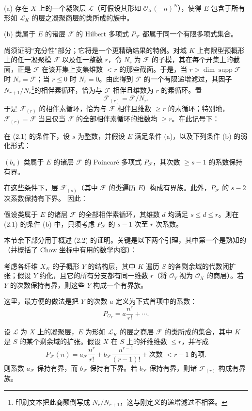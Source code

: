 \medskip
\noindent (a) 存在 $X$ 上的一个凝聚层 $\mathcal L$（可假设其形如
$\mathcal O_X(-n)^N$），使得 $E$ 包含于所有形如 $\mathcal L_K$ 的层之凝聚商层的类所成的族中。

\smallskip
\noindent (b) 类属于 $E$ 的诸层 $\mathcal F$ 的 Hilbert 多项式
$P_{\mathcal F}$ 都属于同一个有限多项式集合。

尚须证明“充分性”部分；它将是一个更精确结果的特例。对域 $K$ 上有限型预概形上的任一凝聚模 $\mathcal F$ 以及任一整数 $r$，令
$N_r$ 为 $\mathcal F$ 的子模，其在每个开集上的截面，正是
$\mathcal F$ 在该开集上支集维数 $<r$ 的那些截面。于是，当
$r>\dim\operatorname{supp}\mathcal F$ 时
$N_r=\mathcal F$；当 $r\leq0$ 时 $N_r=0$。由此得到
$\mathcal F$ 的一个有限递增滤过，其因子
$N_{r+1}/N_r$\footnote{印刷文本把此商颠倒写成
$N_r/N_{r+1}$，这与刚定义的递增滤过不相容。}的相伴素循环，恰为与
$\mathcal F$ 相伴且维数为 $r$ 的素循环。置
\[
\mathcal F_{(r)}=\mathcal F/N_r.
\]
于是 $\mathcal F_{(r)}$ 的相伴素循环，恰为与 $\mathcal F$ 相伴且维数
$\geq r$ 的素循环；特别地，$\mathcal F_{(r)}=\mathcal F$ 当且仅当
$\mathcal F$ 的全部相伴素循环的维数均 $\geq r$。在此记号下：

 在 (2.1) 的条件下，设 $s$ 为整数，并假设 $E$ 满足条件 (a)，以及下列条件 (b) 的弱化形式：

\medskip
\noindent $(b_s)$ 类属于 $E$ 的诸层 $\mathcal F$ 的 Poincaré 多项式
$P_{\mathcal F}$，其次数 $\geq s-1$ 的系数保持有界。

在这些条件下，层 $\mathcal F_{(s)}$（其中 $\mathcal F$ 的类遍历
$E$）构成有界族。此外，$P_{\mathcal F}$ 的 $s-2$ 次系数保持有下界。
因此：

 假设类属于 $E$ 的诸层 $\mathcal F$ 的全部相伴素循环，其维数 $d$ 均满足 $s\leq d\leq r$。则在 (2.1) 的条件
(b) 中，只须考虑 $P_{\mathcal F}$ 的 $s-1$ 次至 $r$ 次系数。

本节余下部分用于概述 (2.2) 的证明。关键是以下两个引理，其中第一个是熟知的（并概括了 Chow 坐标中有用的数学内容）：

 考虑各纤维 $X_K$ 的子概形 $Y$ 的结构层，其中 $K$ 遍历 $S$ 的各剩余域的代数闭扩张；假设 $Y$ 约化，且它的所有分支都有同一维数 $r$（将 $\mathcal O_Y$ 视为
$\mathcal O_X$ 的商层）。若 $Y$ 的次数保持有界，则这些 $Y$ 构成一个有界族。

这里，最方便的做法是把 $Y$ 的次数 $a$ 定义为下式首项中的系数：
\[
P_{\mathcal O_Y}=a\frac{n^r}{r!}+\cdots.
\]

 设 $\mathcal L$ 为 $X$ 上的凝聚层，$E$ 为形如
$\mathcal L_K$ 的层之商层 $\mathcal F$ 的类所成的集合，其中 $K$ 是
$S$ 的某个剩余域的扩张。假设 $X$ 在 $S$ 上的纤维维数
$\leq r$，并写成
\[
P_{\mathcal F}(n)=a_{\mathcal F}\frac{n^r}{r!}
+b_{\mathcal F}\frac{n^{r-1}}{(r-1)!}
+\text{次数 $<r-1$ 的项}.
\]
则系数 $a_{\mathcal F}$ 保持有界，而 $b_{\mathcal F}$ 保持有下界。若
$b_{\mathcal F}$ 保持有界，则诸 $\mathcal F_{(r)}$ 构成有界族。

